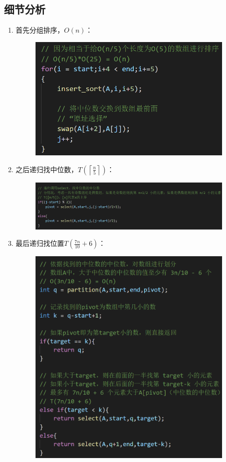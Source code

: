 \documentclass{ctexart}[UTF8]
\begin{document}
    \subsection{细节分析}
    \begin{enumerate}
        \item 首先分组排序，$O(n)$：\begin{figure}[H]
            \centering
            \includegraphics[width=10cm]{../Resources/6_2.png}
        \end{figure}
        \item 之后递归找中位数，$T(\left\lceil \frac{n}{5}\right\rceil)$：\begin{figure}[H]
            \centering
            \includegraphics[width=10cm]{../Resources/6_3.png}
        \end{figure}
        \item 最后递归找位置$T(\frac{7n}{10} + 6)$：\begin{figure}[H]
            \centering
            \includegraphics[width=10cm]{../Resources/6_4.png}
        \end{figure}

    \end{enumerate}
\end{document}
